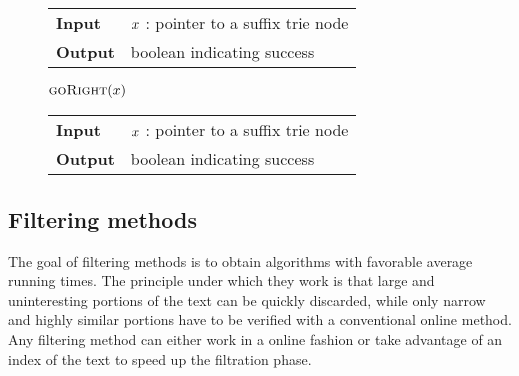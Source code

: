 \begin{figure*}
\begin{minipage}[t]{.5\textwidth}
\begin{algorithm}[H]
\begin{tabular}{ll}
\textbf{Input}  & $x$ : pointer to a suffix trie node\\
\textbf{Output} & boolean indicating success\\
\end{tabular}
\begin{algorithmic}[1]
	\State \Return \False
\EndIf
{}
	\State \Return \True
\Else
	\State \Return $\Call{goRight}{$\Tn$}$		
\EndIf
\end{algorithmic}
\label{alg:st-godown}
\end{algorithm}
\end{minipage}
\hfill
\begin{minipage}[t]{.5\textwidth}
\begin{algorithm}[H]
\begin{tabular}{ll}
\textbf{Input}  & $x$ : pointer to a suffix trie node\\
\textbf{Output} & boolean indicating success\\
\end{tabular}
\begin{algorithmic}[1]
			\State \Return \True
		\EndIf
	\EndWhile
\EndIf
\State \Return \False
\end{algorithmic}
\label{alg:st-goright}
\end{algorithm}
\end{minipage}
\end{figure*}



\subsection{Filtering methods}
\label{sec:intro:filtering}

The goal of filtering methods is to obtain algorithms with favorable average running times.
The principle under which they work is that large and uninteresting portions of the text can be quickly discarded, while only narrow and highly similar portions have to be verified with a conventional online method.
Any filtering method can either work in a online fashion or take advantage of an index of the text to speed up the filtration phase.

